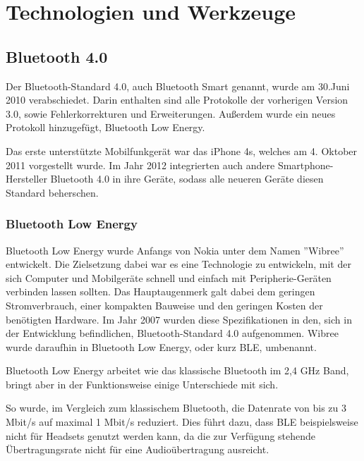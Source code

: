 \chapter{Technologien und Werkzeuge}
\label{chap:technologies}

\section{Bluetooth 4.0}
\label{sec:technologies:bluetooth4}

Der Bluetooth-Standard 4.0, auch Bluetooth Smart genannt, wurde am 30.Juni 2010 verabschiedet. Darin enthalten sind alle Protokolle der vorherigen Version 3.0, sowie Fehlerkorrekturen und Erweiterungen. Außerdem wurde ein neues Protokoll hinzugefügt, Bluetooth Low Energy. 

Das erste unterstützte Mobilfunkgerät war das iPhone 4s, welches am 4. Oktober 2011 vorgestellt wurde. Im Jahr 2012 integrierten auch andere Smartphone-Hersteller Bluetooth 4.0 in ihre Geräte, sodass alle neueren Geräte diesen Standard beherschen.


\subsection{Bluetooth Low Energy}
\label{sec:technologies:bluetoothLE}

Bluetooth Low Energy wurde Anfangs von Nokia unter dem Namen ''Wibree'' entwickelt. Die Zielsetzung dabei war es eine Technologie zu entwickeln, mit der sich Computer und Mobilgeräte schnell und einfach mit Peripherie-Geräten verbinden lassen sollten. Das Hauptaugenmerk galt dabei dem geringen Stromverbrauch, einer kompakten Bauweise und den geringen Kosten der benötigten Hardware.
Im Jahr 2007 wurden diese Spezifikationen in den, sich in der Entwicklung befindlichen, Bluetooth-Standard 4.0 aufgenommen. Wibree wurde daraufhin in Bluetooth Low Energy, oder kurz BLE, umbenannt.

Bluetooth Low Energy arbeitet wie das klassische Bluetooth im 2,4 GHz Band, bringt aber in der Funktionsweise einige Unterschiede mit sich.

So wurde, im Vergleich zum klassischem Bluetooth, die Datenrate von bis zu 3 Mbit/s auf maximal 1 Mbit/s reduziert. Dies führt dazu, dass BLE beispielsweise nicht für Headsets genutzt werden kann, da die zur Verfügung stehende Übertragungsrate nicht für eine Audioübertragung ausreicht.


